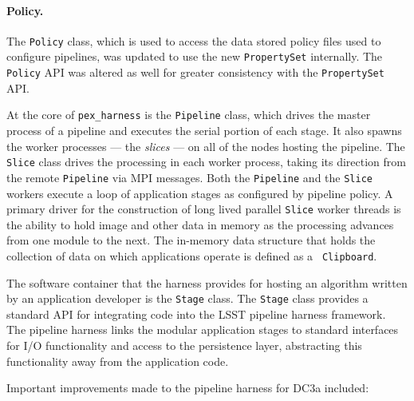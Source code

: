 \paragraph{Policy.}  The {\tt Policy} class, which is used to access
the data stored policy files used to configure pipelines, was updated
to use the new {\tt PropertySet} internally.  The {\tt Policy} API was
altered as well for greater consistency with the {\tt PropertySet}
API.  

 \label{sec:harness}

At the core of {\tt pex\_harness} is the {\tt Pipeline} class, which
drives the master process of a pipeline and executes the serial portion of
each stage.  It also spawns the worker processes --- the {\it slices} --- on
all of the nodes hosting the pipeline.  The {\tt Slice} class drives
the processing in each worker process, taking its direction from the
remote {\tt Pipeline} via MPI messages.  Both the {\tt Pipeline} and
the {\tt Slice} workers execute a loop of application stages as
configured by pipeline policy.  A primary driver for the construction
of long lived parallel {\tt Slice} worker threads is the ability to
hold image and other data in memory as the processing advances from
one module to the next. The in-memory data structure that holds the
collection of data on which applications operate is defined as a {\tt
Clipboard}.

The software container that the harness provides for hosting an
algorithm written by an application developer is the {\tt Stage}
class.  The {\tt Stage} class provides a standard API for integrating
code into the LSST pipeline harness framework.  The pipeline harness
links the modular application stages to standard interfaces for I/O
functionality and access to the persistence layer, abstracting this
functionality away from the application code.

Important improvements made to the pipeline harness for DC3a included:

